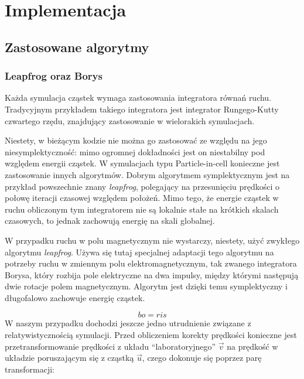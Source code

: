 {\section[Implementacja]{Implementacja}%
    \subsection{Zastosowane algorytmy}
    \subsubsection{Leapfrog oraz Borys}
    Każda symulacja cząstek wymaga zastosowania integratora równań ruchu. Tradycyjnym przykładem takiego
    integratora jest integrator Rungego-Kutty czwartego rzędu, znajdujący zastosowanie w wielorakich
    symulacjach. 

    Niestety, w bieżącym kodzie nie można go zastosować ze względu na jego niesymplektyczność:
    mimo ogromnej dokładności jest on niestabilny pod względem energii cząstek. 
    W symulacjach typu Particle-in-cell konieczne jest zastosowanie innych algorytmów. Dobrym algorytmem
    symplektycznym jest na przykład powszechnie znany \emph{leapfrog}, polegający na
    przesunięciu prędkości o połowę iteracji czasowej względem położeń.
    Mimo tego, że energie cząstek w ruchu obliczonym tym integratorem nie są lokalnie stałe na krótkich skalach
    czasowych, to jednak zachowują energię na skali globalnej.


    W przypadku ruchu w polu magnetycznym nie wystarczy, niestety, użyć zwykłego algorytmu \emph{leapfrog}. 
    Używa się tutaj specjalnej adaptacji tego algorytmu na potrzeby ruchu w zmiennym polu elektromagnetycznym,
    tak zwanego integratora Borysa, 
    który rozbija pole elektryczne na dwa impulsy, między którymi następują dwie 
    rotacje polem magnetycznym. Algorytm jest dzięki temu symplektyczny
    i długofalowo zachowuje energię cząstek.
    
    \begin{equation}
        bo = ris
        \label{eqn:boris-pusher}
    \end{equation}
    W naszym przypadku dochodzi jeszcze jedno utrudnienie związane z relatywistycznością symulacji. 
    Przed obliczeniem korekty prędkości konieczne jest przetransformowanie prędkości z układu ``laboratoryjnego'' $\vec{v}$
    na prędkość w układzie poruszającym się z cząstką $\vec{u}$, czego dokonuje się poprzez parę transformacji:

}
